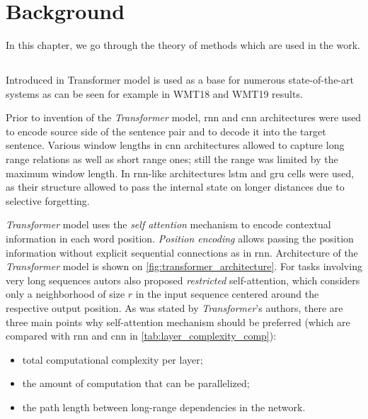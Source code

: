 \chapter{Background}

In this chapter, we go through the theory of methods which are used in the work.

\section{}



\section{}

Introduced in  Transformer model is used as a base
for numerous state-of-the-art systems as can be seen for example in 
WMT18  and
WMT19  results.

Prior to invention of the \textit{Transformer} model, \acrfull{rnn} and \acrfull{cnn}
architectures were used
to encode source side of the sentence pair and to decode it into the target sentence.
Various window lengths in \acrshort{cnn} architectures allowed to capture
long range relations as well as short range ones;
still the range was limited by the maximum window length.
In \acrshort{rnn}-like architectures \acrfull{lstm} and \acrfull{gru} cells
were used, as their structure allowed to pass the internal state
on longer distances due to selective forgetting.

\textit{Transformer} model uses the \textit{self attention} mechanism
to encode contextual information in each word position.
\textit{Position encoding} allows passing the position
information without explicit sequential connections as in \acrshort{rnn}.
Architecture of the \textit{Transformer} model is shown
on \cref{fig:transformer_architecture}.
For tasks involving very long sequences autors also proposed \textit{restricted}
self-attention, which considers only a neighborhood of size $r$ in the input
sequence centered around the respective output position.
As was stated by \textit{Transformer}'s authors, there are three main points why
self-attention mechanism should be preferred
(which are compared with \acrshort{rnn} and \acrshort{cnn}
in \cref{tab:layer_complexity_comp}):
\begin{itemize}
  \item total computational complexity per layer;
  \item the amount of computation that can be parallelized;
  \item the path length between long-range dependencies in the network.
\end{itemize}

